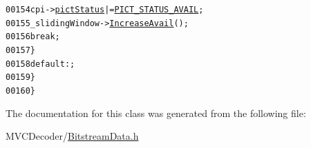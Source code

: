 \begin{footnotesize}
\begin{alltt}
00154                                         cpi->\hyperlink{struct_coding_pict_info_a41498e5ba764405481005e6569d7f728}{pictStatus} |= \hyperlink{_picture_info_8h_aecbf7bf3158e75ca4906202b17b8f9ef}{PICT_STATUS_AVAIL};
00155                                         \_slidingWindow->\hyperlink{class_sliding_window_a7bce9e53d3618b89f47684ec1432848d}{IncreaseAvail}();
00156                                         \textcolor{keywordflow}{break};
00157                                 \}
00158                         \textcolor{keywordflow}{default} : ;
00159                         \}
00160                 \}
\end{alltt}\end{footnotesize}




The documentation for this class was generated from the following file:\begin{DoxyCompactItemize}
\item 
MVCDecoder/\hyperlink{_bitstream_data_8h}{BitstreamData.h}\end{DoxyCompactItemize}
